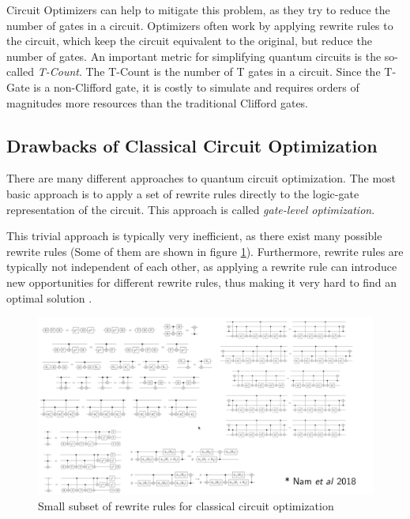 Circuit Optimizers can help to mitigate this problem, as they try to reduce the number of gates in a circuit. Optimizers often work by applying rewrite rules to the circuit, which keep the circuit equivalent to the original, but reduce the number of gates. An important metric for simplifying quantum circuits is the so-called \textit{T-Count}. The T-Count is the number of T gates in a circuit. Since the T-Gate is a non-Clifford gate, it is costly to simulate and requires orders of magnitudes more resources than the traditional Clifford gates. \cite{kissinger2020TCount}

\subsection{Drawbacks of Classical Circuit Optimization}

There are many different approaches to quantum circuit optimization. The most basic approach is to apply a set of rewrite rules directly to the logic-gate representation of the circuit. This approach is called \textit{gate-level optimization}. \cite{namyross2018automated}

This trivial approach is typically very inefficient, as there exist many possible rewrite rules (Some of them are shown in figure \ref{fig:rewrite_rules_classical}). Furthermore, rewrite rules are typically not independent of each other, as applying a rewrite rule can introduce new opportunities for different rewrite rules, thus making it very hard to find an optimal solution \cite{alexkissinger2020introductionzx}.

\begin{figure}[h]
    \centering
    \includegraphics[width=\linewidth]{images/rewrite_rules_classical.png}
    \caption{Small subset of rewrite rules for classical circuit optimization
            {\cite{alexkissinger2020introductionzx}}}
    \label{fig:rewrite_rules_classical}
\end{figure}


